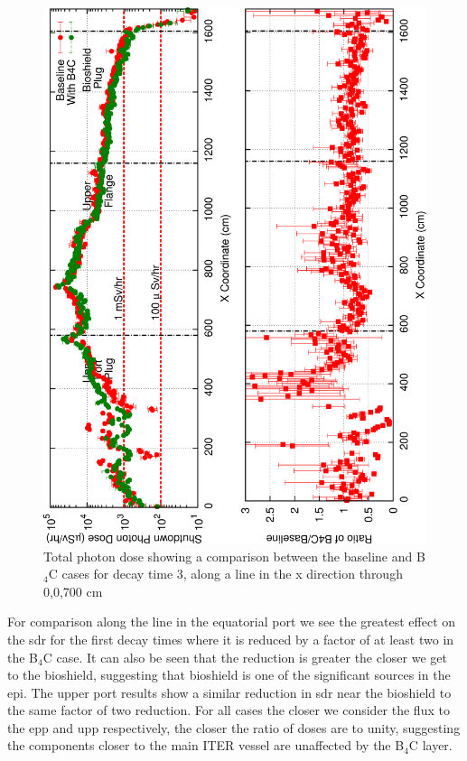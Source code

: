 \documentclass[12pt]{article}
\begin{document}
\begin{figure}[ht!]
\centering
\includegraphics[angle=-90,clip,scale=0.15]{../plots/photon_lineout/dc2_z700_lineout.png}
\caption{Total photon dose showing a comparison between the baseline and B$_4$C cases for decay time 3,
                 along a line in the x direction through 0,0,700 cm}
\label{fig:photons_dc3_total_dose_lineout_z700}
\end{figure}

\newpage
\clearpage
For comparison along the line in the equatorial port we see the greatest effect on the \gls{sdr} for 
the first decay times where it is reduced by a factor of at least two in the B$_4$C 
case. It can also be seen that the reduction is greater the closer we get to the 
bioshield, suggesting that bioshield is one of the significant sources in the 
\gls{epi}. The upper port results show a similar reduction in \gls{sdr} near
the bioshield to the same factor of two reduction. For all cases the closer we
consider the flux to the \gls{epp} and \gls{upp} respectively, the closer the 
ratio of doses are to unity, suggesting the components closer to the main ITER
vessel are unaffected by the B$_4$C layer.
\end{document}

